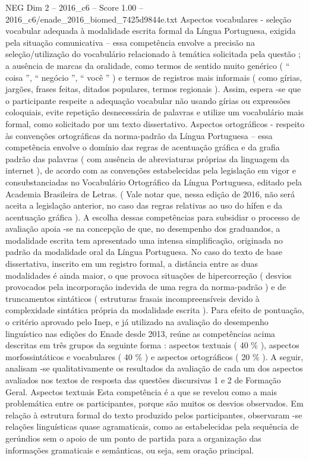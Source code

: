 \begin{textsample}{NEG Dim 2 – 2016\_c6 – Score 1.00 – 2016\_c6/enade\_2016\_biomed\_7425d9844e.txt}
Aspectos vocabulares - seleção vocabular adequada à modalidade escrita formal da Língua Portuguesa, exigida pela situação comunicativa – essa competência envolve a precisão na seleção/utilização do vocabulário relacionado à temática solicitada pela questão ; a ausência de marcas da oralidade, como termos de sentido muito genérico ( “ coisa ”, “ negócio ”, “ você ” ) e termos de registros mais informais ( como gírias, jargões, frases feitas, ditados populares, termos regionais ).
Assim, espera -se que o participante respeite a adequação vocabular não usando gírias ou expressões coloquiais, evite repetição desnecessária de palavras e utilize um vocabulário mais formal, como solicitado por um texto dissertativo.
Aspectos ortográficos - respeito às convenções ortográficas da norma-padrão da Língua Portuguesa – essa competência envolve o domínio das regras de acentuação gráfica e da grafia padrão das palavras ( com ausência de abreviaturas próprias da linguagem da internet ), de acordo com as convenções estabelecidas pela legislação em vigor e consubstanciadas no Vocabulário Ortográfico da Língua Portuguesa, editado pela Academia Brasileira de Letras. ( Vale notar que, nessa edição de 2016, não será aceita a legislação anterior, no caso das regras relativas ao uso do hífen e da acentuação gráfica ).
A escolha dessas competências para subsidiar o processo de avaliação apoia -se na concepção de que, no desempenho dos graduandos, a modalidade escrita tem apresentado uma intensa simplificação, originada no padrão da modalidade oral da Língua Portuguesa.
No caso do texto de base dissertativa, inscrito em um registro formal, a distância entre as duas modalidades é ainda maior, o que provoca situações de hipercorreção ( desvios provocados pela incorporação indevida de uma regra da norma-padrão ) e de truncamentos sintáticos ( estruturas frasais incompreensíveis devido à complexidade sintática própria da modalidade escrita ).
Para efeito de pontuação, o critério aprovado pelo Inep, e já utilizado na avaliação do desempenho linguístico nas edições do Enade desde 2013, reúne as competências acima descritas em três grupos da seguinte forma : aspectos textuais ( 40 \% ), aspectos morfossintáticos e vocabulares ( 40 \% ) e aspectos ortográficos ( 20 \% ).
A seguir, analisam -se qualitativamente os resultados da avaliação de cada um dos aspectos avaliados nos textos de resposta das questões discursivas 1 e 2 de Formação Geral.
Aspectos textuais Esta competência é a que se revelou como a mais problemática entre os participantes, porque são muitos os desvios observados.
Em relação à estrutura formal do texto produzido pelos participantes, observaram -se relações linguísticas quase agramaticais, como as estabelecidas pela sequência de gerúndios sem o apoio de um ponto de partida para a organização das informações gramaticais e semânticas, ou seja, sem oração principal.

\end{textsample}

